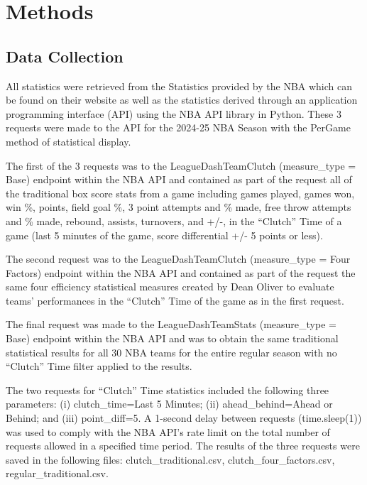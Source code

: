 \section{Methods}

\subsection{Data Collection}

\begin{sloppypar}
All statistics were retrieved from the Statistics provided by the NBA which can be found on their website as well as the statistics derived through an application programming interface (API) using the NBA API library in Python. These 3 requests were made to the API for the 2024-25 NBA Season with the PerGame method of statistical display.

The first of the 3 requests was to the LeagueDashTeamClutch (measure\_type = Base) endpoint within the NBA API and contained as part of the request all of the traditional box score stats from a game including games played, games won, win \%, points, field goal \%, 3 point attempts and \% made, free throw attempts and \% made, rebound, assists, turnovers, and +/-, in the ``Clutch'' Time of a game (last 5 minutes of the game, score differential +/- 5 points or less).

The second request was to the LeagueDashTeamClutch (measure\_type = Four Factors) endpoint within the NBA API and contained as part of the request the same four efficiency statistical measures created by Dean Oliver to evaluate teams' performances in the ``Clutch'' Time of the game as in the first request.

The final request was made to the LeagueDashTeamStats (measure\_type = Base) endpoint within the NBA API and was to obtain the same traditional statistical results for all 30 NBA teams for the entire regular season with no ``Clutch'' Time filter applied to the results.

The two requests for ``Clutch'' Time statistics included the following three parameters: (i) clutch\_time=Last 5 Minutes; (ii) ahead\_behind=Ahead or Behind; and (iii) point\_diff=5. A 1-second delay between requests (time.sleep(1)) was used to comply with the NBA API's rate limit on the total number of requests allowed in a specified time period. The results of the three requests were saved in the following files: clutch\_traditional.csv, clutch\_four\_factors.csv, regular\_traditional.csv.
\end{sloppypar}

